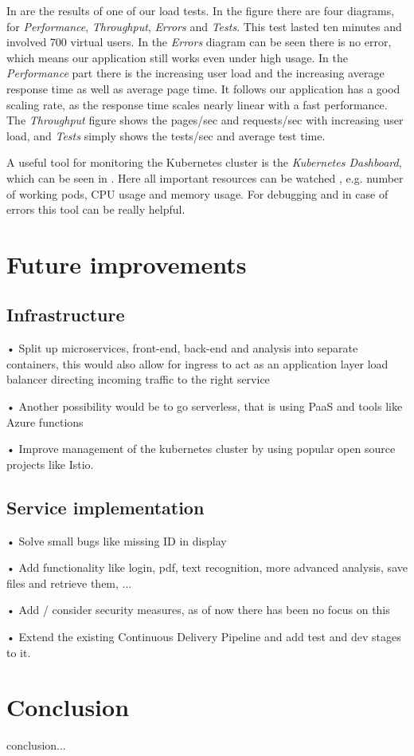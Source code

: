 \documentclass[conference]{IEEEtran}
\begin{document}
In  are the results of one of our load tests. In the figure there are four diagrams, for \textit{Performance}, \textit{Throughput}, \textit{Errors} and \textit{Tests}. This test lasted ten minutes and involved 700 virtual users. In the \textit{Errors} diagram can be seen there is no error, which means our application still works even under high usage. In the \textit{Performance} part there is the increasing user load and the increasing average response time as well as average page time. It follows our application has a good scaling rate, as the response time scales nearly linear with a fast performance. The \textit{Throughput} figure shows the pages/sec and requests/sec with increasing user load, and \textit{Tests} simply shows the tests/sec and average test time.

A useful tool for monitoring the Kubernetes cluster is the \textit{Kubernetes Dashboard}, which can be seen in . Here all important resources can be watched , e.g. number of working pods, CPU usage and memory usage. For debugging and in case of errors this tool can be really helpful.

\section{Future improvements}
\label{sec:future-improvments}
\subsection{Infrastructure}
•	Split up microservices, front-end, back-end and analysis into separate containers, this would also allow for ingress to act as an application layer load balancer directing incoming traffic to the right service

•	Another possibility would be to go serverless, that is using PaaS and tools like Azure functions

•	Improve management of the kubernetes cluster by using popular open source projects like Istio.

\subsection{Service implementation}
•	Solve small bugs like missing ID in display

•	Add functionality like login, pdf, text recognition, more advanced analysis, save files and retrieve them, ...

•	Add / consider security measures, as of now there has been no focus on this

•	Extend the existing Continuous Delivery Pipeline and add test and dev stages to it.

\section{Conclusion}
\label{sec:conclusion}
conclusion...




\end{document}
